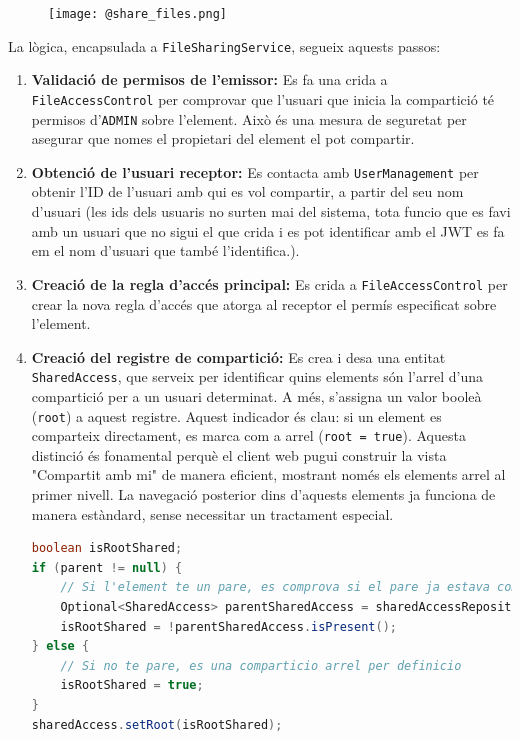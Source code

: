 \begin{figure}[H]
    \centering
    \texttt{[image: @share\_files.png]}
\end{figure}

La lògica, encapsulada a \texttt{FileSharingService}, segueix aquests passos:
\begin{enumerate}
    \item \textbf{Validació de permisos de l'emissor:} Es fa una crida a \texttt{FileAccessControl} per comprovar que l'usuari que inicia la compartició té permisos d'\texttt{ADMIN} sobre l'element. Això és una mesura de seguretat per asegurar que nomes el propietari del element el pot compartir.
    \item \textbf{Obtenció de l'usuari receptor:} Es contacta amb \texttt{UserManagement} per obtenir l'ID de l'usuari amb qui es vol compartir, a partir del seu nom d'usuari (les ids dels usuaris no surten mai del sistema, tota funcio que es favi amb un usuari que no sigui el que crida i es pot identificar amb el JWT es fa em el nom d'usuari que també l'identifica.).
    \item \textbf{Creació de la regla d'accés principal:} Es crida a \texttt{FileAccessControl} per crear la nova regla d'accés que atorga al receptor el permís especificat sobre l'element.
    \item \textbf{Creació del registre de compartició:} Es crea i desa una entitat \texttt{SharedAccess}, que serveix per identificar quins elements són l'arrel d'una compartició per a un usuari determinat. A més, s'assigna un valor booleà (\texttt{root}) a aquest registre. Aquest indicador és clau: si un element es comparteix directament, es marca com a arrel (\texttt{root = true}). Aquesta distinció és fonamental perquè el client web pugui construir la vista "Compartit amb mi" de manera eficient, mostrant només els elements arrel al primer nivell. La navegació posterior dins d'aquests elements ja funciona de manera estàndard, sense necessitar un tractament especial.
    
\begin{lstlisting}[language=Java, caption={Lògica per determinar si una compartició és arrel a `FileSharingService`}]
boolean isRootShared;
if (parent != null) {
    // Si l'element te un pare, es comprova si el pare ja estava compartit amb l'usuari
    Optional<SharedAccess> parentSharedAccess = sharedAccessRepository.findByElementIdAndUserId(parent.getId(), userId);
    isRootShared = !parentSharedAccess.isPresent();
} else {
    // Si no te pare, es una comparticio arrel per definicio
    isRootShared = true;
}
sharedAccess.setRoot(isRootShared);
\end{lstlisting}
    

\end{enumerate}
